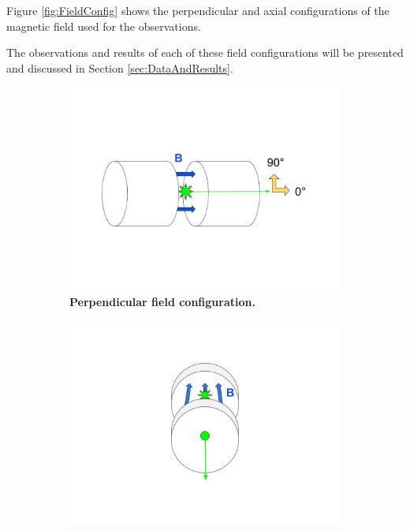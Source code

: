 \documentclass[twocolumn]{article}
\begin{document}
	Figure \ref{fig:FieldConfig} shows the perpendicular and axial configurations of the magnetic field used for the observations.
	
	The observations and results of each of these field configurations will be presented and discussed in Section \ref{sec:DataAndResults}.
	
	 
	
	
	\begin{figure}
		\centering
		\begin{subfigure}{0.55\textwidth}
			\includegraphics[width = 1.0\textwidth]{Images/FieldConfigA.jpg}
			\caption{\textbf{Perpendicular field configuration.}}
			\label{subfig:PerpFieldConfig}
		\end{subfigure}%
		\begin{subfigure}{0.55\textwidth}
			\centering
			\includegraphics[width=1.0\textwidth]{Images/FieldConfigB.jpg}

\end{subfigure}
\end{figure}
\end{document}
